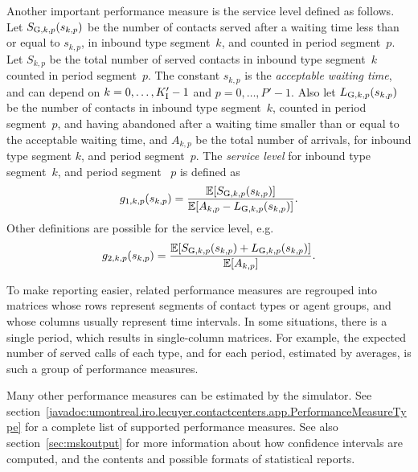 Another important performance measure is the service level
defined as follows.
Let $\Sg[k,p](s_{k,p})$ be the number of contacts served
after a waiting time less than or equal to $s_{k,p}$,
in inbound type segment~$k$, and
counted in period segment~$p$. Let
$S_{k,p}$ be the total number of served contacts
in inbound type segment~$k$
counted in period segment~$p$.
The constant $s_{k,p}$ is the \emph{acceptable waiting time}, and can
depend on $k=0,\ldots,K_{\mathrm{I}}'-1$ and $p=0,\ldots,P'-1$.
Also let $\Lg[k,p](s_{k,p})$ be
the number of contacts
in inbound type segment~$k$, counted in period segment~$p$, and
having abandoned after a waiting time smaller than
or equal to the acceptable waiting time, and $A_{k,p}$ be the
total number of arrivals, for inbound type segment $k$, and period
segment~$p$.
The \emph{service level} for inbound type segment~$k$,
and period segment~ $p$ is defined as
\[g_{1,k,p}(s_{k,p})=\frac{\E[\Sg[k,p](s_{k,p})]}{\E[A_{k,p} - \Lg[k,p](s_{k,p})]}.\]
Other definitions are possible for the service level, e.g.
\[g_{2,k,p}(s_{k,p})=\frac{\E[\Sg[k,p](s_{k,p}) + \Lg[k,p](s_{k,p})]}{\E[A_{k,p}]}.\]


To make reporting easier,
related  performance
measures are regrouped into
matrices whose rows represent segments of
contact types or agent groups, and whose
columns usually represent time intervals.  In some situations, there is a
single period, which results in single-column matrices.
For example, the expected number of served calls of each
type, and for each period, estimated by averages, is such a group of
performance measures.

Many other performance measures can be estimated by the simulator.
See
section~\ref{javadoc:umontreal.iro.lecuyer.contactcenters.app.PerformanceMeasureType}
for a complete list of supported performance measures.
See also section~\ref{sec:mskoutput} for more information about how
confidence intervals are computed, and the contents and possible
formats of statistical reports.

